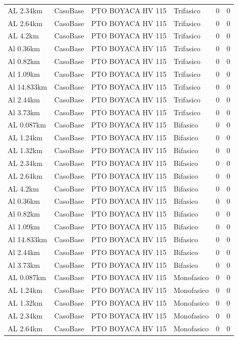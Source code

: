 \documentclass[11pt,a4paper]{article}
\begin{document}
\begin{longtable}{llllrr}
AL 2.34km & CasoBase & PTO BOYACA HV 115 & Trifasico & 0 & 0 \\
AL 2.64km & CasoBase & PTO BOYACA HV 115 & Trifasico & 0 & 0 \\
AL 4.2km & CasoBase & PTO BOYACA HV 115 & Trifasico & 0 & 0 \\
Al 0.36km & CasoBase & PTO BOYACA HV 115 & Trifasico & 0 & 0 \\
Al 0.82km & CasoBase & PTO BOYACA HV 115 & Trifasico & 0 & 0 \\
Al 1.09km & CasoBase & PTO BOYACA HV 115 & Trifasico & 0 & 0 \\
Al 14.833km & CasoBase & PTO BOYACA HV 115 & Trifasico & 0 & 0 \\
Al 2.44km & CasoBase & PTO BOYACA HV 115 & Trifasico & 0 & 0 \\
Al 3.73km & CasoBase & PTO BOYACA HV 115 & Trifasico & 0 & 0 \\
AL 0.087km & CasoBase & PTO BOYACA HV 115 & Bifasico & 0 & 0 \\
AL 1.24km & CasoBase & PTO BOYACA HV 115 & Bifasico & 0 & 0 \\
AL 1.32km & CasoBase & PTO BOYACA HV 115 & Bifasico & 0 & 0 \\
AL 2.34km & CasoBase & PTO BOYACA HV 115 & Bifasico & 0 & 0 \\
AL 2.64km & CasoBase & PTO BOYACA HV 115 & Bifasico & 0 & 0 \\
AL 4.2km & CasoBase & PTO BOYACA HV 115 & Bifasico & 0 & 0 \\
Al 0.36km & CasoBase & PTO BOYACA HV 115 & Bifasico & 0 & 0 \\
Al 0.82km & CasoBase & PTO BOYACA HV 115 & Bifasico & 0 & 0 \\
Al 1.09km & CasoBase & PTO BOYACA HV 115 & Bifasico & 0 & 0 \\
Al 14.833km & CasoBase & PTO BOYACA HV 115 & Bifasico & 0 & 0 \\
Al 2.44km & CasoBase & PTO BOYACA HV 115 & Bifasico & 0 & 0 \\
Al 3.73km & CasoBase & PTO BOYACA HV 115 & Bifasico & 0 & 0 \\
AL 0.087km & CasoBase & PTO BOYACA HV 115 & Monofasico & 0 & 0 \\
AL 1.24km & CasoBase & PTO BOYACA HV 115 & Monofasico & 0 & 0 \\
AL 1.32km & CasoBase & PTO BOYACA HV 115 & Monofasico & 0 & 0 \\
AL 2.34km & CasoBase & PTO BOYACA HV 115 & Monofasico & 0 & 0 \\
AL 2.64km & CasoBase & PTO BOYACA HV 115 & Monofasico & 0 & 0 \\

\end{longtable}
\end{document}
